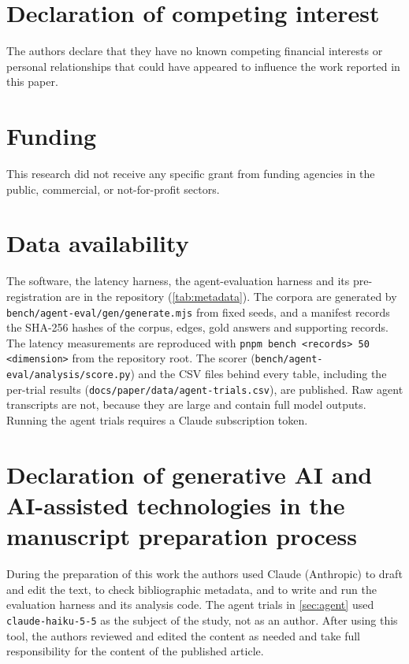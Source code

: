 \documentclass[preprint,12pt,a4paper]{elsarticle}
\newcommand{\code}[1]{\texttt{#1}}
\begin{document}
\section*{Declaration of competing interest}

The authors declare that they have no known competing financial interests or personal relationships that could have appeared to influence the work reported in this paper.

\section*{Funding}

This research did not receive any specific grant from funding agencies in the public, commercial, or not-for-profit sectors.

\section*{Data availability}

{\sloppy The software, the latency harness, the agent-evaluation harness and its pre-registration are in the repository (\cref{tab:metadata}). The corpora are generated by \nolinkurl{bench/agent-eval/gen/generate.mjs} from fixed seeds, and a manifest records the SHA-256 hashes of the corpus, edges, gold answers and supporting records. The latency measurements are reproduced with \code{pnpm bench <records> 50 <dimension>} from the repository root. The scorer (\nolinkurl{bench/agent-eval/analysis/score.py}) and the CSV files behind every table, including the per-trial results (\nolinkurl{docs/paper/data/agent-trials.csv}), are published. Raw agent transcripts are not, because they are large and contain full model outputs. Running the agent trials requires a Claude subscription token.\par}

\section*{Declaration of generative AI and AI-assisted technologies in the manuscript preparation process}

During the preparation of this work the authors used Claude (Anthropic) to draft and edit the text, to check bibliographic metadata, and to write and run the evaluation harness and its analysis code. The agent trials in \cref{sec:agent} used \code{claude-haiku-5-5} as the subject of the study, not as an author. After using this tool, the authors reviewed and edited the content as needed and take full responsibility for the content of the published article.
\end{document}
